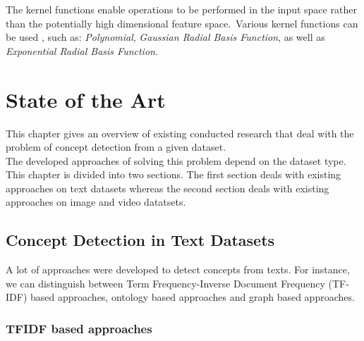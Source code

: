			The kernel functions enable operations to be performed in the input space rather than the potentially high dimensional feature space.\ Various kernel functions can be used \cite{a:Nello:Svm}, such as: \textit{Polynomial}, \textit{Gaussian Radial Basis Function}, as well as \textit{Exponential Radial Basis Function}.
\chapter{State of the Art}

This chapter gives an overview of existing conducted research that deal with the problem of concept detection from a given dataset.\\ The developed approaches of solving this problem depend on the dataset type. This chapter is divided into two sections. The first section deals with existing approaches on text datasets whereas the second section deals with existing approaches on image and video datatsets.
\section{Concept Detection in Text Datasets}
A lot of approaches were developed to detect concepts from texts. For instance, we can distinguish between Term Frequency-Inverse Document Frequency (TF-IDF) based approaches, ontology based approaches and graph based approaches.
\subsection{TFIDF based approaches}
